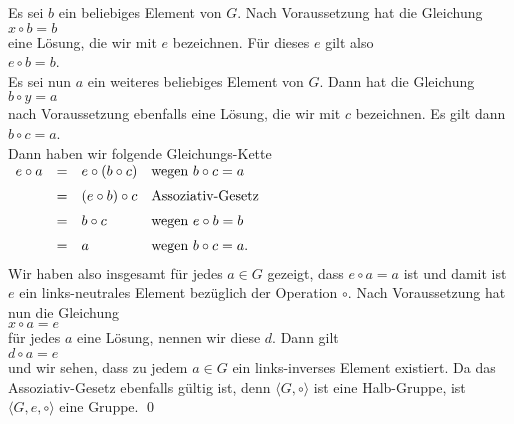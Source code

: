\proof
Es sei $b$ ein beliebiges Element von $G$.  Nach Voraussetzung hat die Gleichung
\\[0.2cm]
\hspace*{1.3cm}
$x \circ b = b$
\\[0.2cm]
eine Lösung, die wir mit $e$ bezeichnen.  Für dieses $e$ gilt also
\\[0.2cm]
\hspace*{1.3cm}
$e \circ b = b$.
\\[0.2cm]
Es sei nun $a$ ein weiteres beliebiges Element von $G$.  Dann hat die Gleichung
\\[0.2cm]
\hspace*{1.3cm}
$b \circ y = a$
\\[0.2cm]
nach Voraussetzung ebenfalls eine Lösung, die wir mit $c$ bezeichnen.  Es gilt dann
\\[0.2cm]
\hspace*{1.3cm}
$b \circ c = a$.
\\[0.2cm]
Dann haben wir folgende Gleichungs-Kette
\\[0.2cm]
\hspace*{1.3cm}
$
\begin{array}[t]{lcll}
  e \circ a & = & e \circ (b \circ c)
                & \mbox{wegen $b \circ c = a$}  \\[0.2cm]
            & = & (e \circ b) \circ c
                & \mbox{Assoziativ-Gesetz}  \\[0.2cm]
            & = & b \circ c
                & \mbox{wegen $e \circ b = b$}  \\[0.2cm]
            & = & a
                & \mbox{wegen $b \circ c = a$.}  \\[0.2cm]
\end{array}
$
\\[0.2cm]
Wir haben also insgesamt für jedes $a \in G$ gezeigt, dass $e \circ a = a$ ist und damit ist
$e$ ein links-neutrales Element bezüglich der Operation $\circ$.  Nach Voraussetzung hat nun 
die Gleichung
\\[0.2cm]
\hspace*{1.3cm}
$x \circ a = e$
\\[0.2cm]
für jedes $a$ eine Lösung, nennen wir diese $d$.  Dann gilt
\\[0.2cm]
\hspace*{1.3cm}
$d \circ a = e$
\\[0.2cm]
und wir sehen, dass zu jedem $a \in G$ ein links-inverses Element existiert.
Da das Assoziativ-Gesetz ebenfalls gültig ist, denn $\langle G, \circ \rangle$ ist eine Halb-Gruppe,
ist $\langle G, e, \circ \rangle$ eine Gruppe.   \qed

